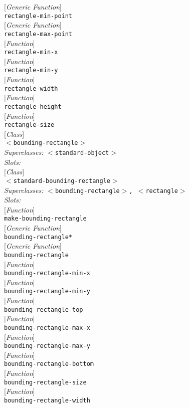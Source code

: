\documentclass[10pt]{book}
\newenvironment{defother}[2]{[\textit{#1}]\\\texttt{#2}}{\\}
\newenvironment{defun}[1]{\begin{defother}{Function}{#1}}{\end{defother}}
\newenvironment{defgeneric}[1]{\begin{defother}{Generic Function}{#1}}{\end{defother}}
\newenvironment{defclass}[2]{[\textit{Class}]\\\texttt{#1}\\\textit{Superclasses:} \texttt{#2}\\\textit{Slots:}}{\\}
\begin{document}
\begin{defgeneric}{rectangle-min-point}\end{defgeneric}
\begin{defgeneric}{rectangle-max-point}\end{defgeneric}
\begin{defun}{rectangle-min-x}\end{defun}
\begin{defun}{rectangle-min-y}\end{defun}
\begin{defun}{rectangle-width}\end{defun}
\begin{defun}{rectangle-height}\end{defun}
\begin{defun}{rectangle-size}\end{defun}
\begin{defclass}{$<$bounding-rectangle$>$}{$<$standard-object$>$}\end{defclass}
\begin{defclass}{$<$standard-bounding-rectangle$>$}{$<$bounding-rectangle$>$, $<$rectangle$>$}\end{defclass}
\begin{defun}{make-bounding-rectangle}\end{defun}
\begin{defgeneric}{bounding-rectangle*}\end{defgeneric}
\begin{defgeneric}{bounding-rectangle}\end{defgeneric}
\begin{defun}{bounding-rectangle-min-x}\end{defun}
\begin{defun}{bounding-rectangle-min-y}\end{defun}
\begin{defun}{bounding-rectangle-top}\end{defun}
\begin{defun}{bounding-rectangle-max-x}\end{defun}
\begin{defun}{bounding-rectangle-max-y}\end{defun}
\begin{defun}{bounding-rectangle-bottom}\end{defun}
\begin{defun}{bounding-rectangle-size}\end{defun}
\begin{defun}{bounding-rectangle-width}\end{defun}
\end{document}
